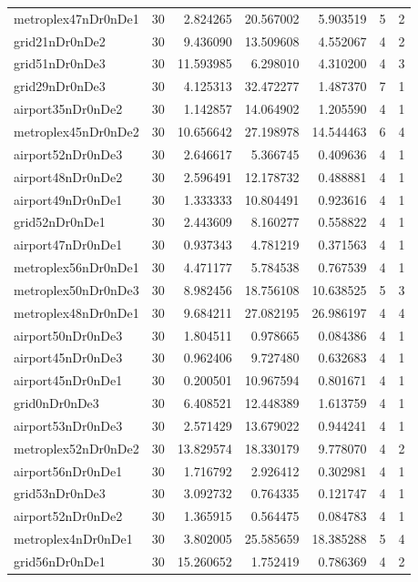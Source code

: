 \documentclass[../../../thesis.tex]{subfiles}
\begin{document}
\begin{longtable}{|l|r|r|r|r|r|r|}
metroplex47nDr0nDe1 & 30 & 2.824265 & 20.567002 & 5.903519 & 5 & 2 \\
grid21nDr0nDe2 & 30 & 9.436090 & 13.509608 & 4.552067 & 4 & 2 \\
grid51nDr0nDe3 & 30 & 11.593985 & 6.298010 & 4.310200 & 4 & 3 \\
grid29nDr0nDe3 & 30 & 4.125313 & 32.472277 & 1.487370 & 7 & 1 \\
airport35nDr0nDe2 & 30 & 1.142857 & 14.064902 & 1.205590 & 4 & 1 \\
metroplex45nDr0nDe2 & 30 & 10.656642 & 27.198978 & 14.544463 & 6 & 4 \\
airport52nDr0nDe3 & 30 & 2.646617 & 5.366745 & 0.409636 & 4 & 1 \\
airport48nDr0nDe2 & 30 & 2.596491 & 12.178732 & 0.488881 & 4 & 1 \\
airport49nDr0nDe1 & 30 & 1.333333 & 10.804491 & 0.923616 & 4 & 1 \\
grid52nDr0nDe1 & 30 & 2.443609 & 8.160277 & 0.558822 & 4 & 1 \\
airport47nDr0nDe1 & 30 & 0.937343 & 4.781219 & 0.371563 & 4 & 1 \\
metroplex56nDr0nDe1 & 30 & 4.471177 & 5.784538 & 0.767539 & 4 & 1 \\
metroplex50nDr0nDe3 & 30 & 8.982456 & 18.756108 & 10.638525 & 5 & 3 \\
metroplex48nDr0nDe1 & 30 & 9.684211 & 27.082195 & 26.986197 & 4 & 4 \\
airport50nDr0nDe3 & 30 & 1.804511 & 0.978665 & 0.084386 & 4 & 1 \\
airport45nDr0nDe3 & 30 & 0.962406 & 9.727480 & 0.632683 & 4 & 1 \\
airport45nDr0nDe1 & 30 & 0.200501 & 10.967594 & 0.801671 & 4 & 1 \\
grid0nDr0nDe3 & 30 & 6.408521 & 12.448389 & 1.613759 & 4 & 1 \\
airport53nDr0nDe3 & 30 & 2.571429 & 13.679022 & 0.944241 & 4 & 1 \\
metroplex52nDr0nDe2 & 30 & 13.829574 & 18.330179 & 9.778070 & 4 & 2 \\
airport56nDr0nDe1 & 30 & 1.716792 & 2.926412 & 0.302981 & 4 & 1 \\
grid53nDr0nDe3 & 30 & 3.092732 & 0.764335 & 0.121747 & 4 & 1 \\
airport52nDr0nDe2 & 30 & 1.365915 & 0.564475 & 0.084783 & 4 & 1 \\
metroplex4nDr0nDe1 & 30 & 3.802005 & 25.585659 & 18.385288 & 5 & 4 \\
grid56nDr0nDe1 & 30 & 15.260652 & 1.752419 & 0.786369 & 4 & 2 \\

\end{longtable}
\end{document}

